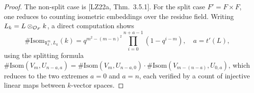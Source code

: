 \begin{proof}
  The non-split case is [LZ22a, Thm.~3.5.1]. For the split case \(F' = F \times F\),
  one reduces to counting isometric embeddings over the residue field. Writing
  \(L_k = L \otimes_{\mathcal{O}_F} k\), a direct computation shows
  \[
    \# \mathrm{Isom}_{\mathbf{1}^m_k, L_k}(k)
      = q^{m^2-(m-n)^2} \prod_{i=0}^{n+a-1}(1 - q^{i-m}),
    \quad a = t'(L),
  \]
  using the splitting formula
  \(\# \mathrm{Isom}(V_m, U_{n-a,a}) = \# \mathrm{Isom}(V_m, U_{n-a,0})
    \cdot \# \mathrm{Isom}(V_{m-(n-a)}, U_{0,a})\),
  which reduces to the two extremes \(a = 0\) and \(a = n\), each verified by a
  count of injective linear maps between \(k\)-vector spaces.
\end{proof}
